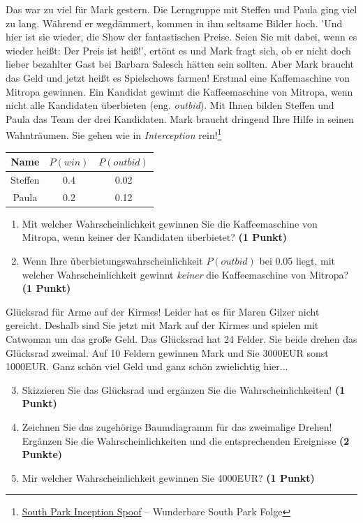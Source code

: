 \documentclass[a4paper, 9pt]{scrartcl}\usepackage[]{graphicx}\usepackage[]{xcolor}
\begin{document}
Das war zu viel für Mark gestern. Die Lerngruppe mit Steffen und Paula ging viel zu lang. Während er wegdämmert, kommen in ihm seltsame Bilder hoch. 'Und hier ist sie wieder, die Show der fantastischen Preise. Seien Sie mit dabei, wenn es wieder heißt: Der Preis ist heiß!', ertönt es und Mark fragt sich, ob er nicht doch lieber bezahlter Gast bei Barbara Salesch hätten sein sollten. Aber Mark braucht das Geld und jetzt heißt es Spielschows farmen! Erstmal eine Kaffemaschine von Mitropa gewinnen. Ein Kandidat gewinnt die Kaffeemaschine von Mitropa, wenn nicht alle Kandidaten überbieten (eng. \textit{outbid}). Mit Ihnen bilden Steffen und Paula das Team der drei Kandidaten. Mark braucht dringend Ihre Hilfe in seinen Wahnträumen. Sie gehen wie in \textit{Interception} rein!\footnote{\href{https://www.youtube.com/watch?v=3RhxyHMs-w8}{South Park Inception Spoof} -- Wunderbare South Park Folge}

\begin{center}
\begin{tabular}{ccc}
  \toprule
  Name & $P(win)$ & $P(outbid)$\\
  \midrule
  Steffen & 0.4 & 0.02\\
  Paula & 0.2 & 0.12 \\
  \bottomrule
\end{tabular}
\end{center}

\begin{enumerate}
\item Mit welcher Wahrscheinlichkeit gewinnen Sie die Kaffeemaschine von Mitropa, wenn keiner der Kandidaten überbietet? \textbf{(1 Punkt)}
\item Wenn Ihre überbietungswahrscheinlichkeit $P(outbid)$ bei 0.05 liegt, mit welcher Wahrscheinlichkeit gewinnt \textit{keiner} die Kaffeemaschine von Mitropa? \textbf{(1 Punkt)}
\end{enumerate}

Glücksrad für Arme auf der Kirmes! Leider hat es für Maren Gilzer nicht gereicht. Deshalb sind Sie jetzt mit Mark auf der Kirmes und spielen mit Catwoman um das große Geld. Das Glücksrad hat 24 Felder. Sie beide drehen das Glücksrad zweimal. Auf 10 Feldern gewinnen Mark und Sie 3000EUR sonst 1000EUR. Ganz schön viel Geld und ganz schön zwielichtig hier...

\begin{enumerate}
  \setcounter{enumi}{2}  
\item Skizzieren Sie das Glücksrad und ergänzen Sie die Wahrscheinlichkeiten! \textbf{(1 Punkt)}
\item Zeichnen Sie das zugehörige Baumdiagramm für das zweimalige Drehen! Ergänzen Sie die Wahrscheinlichkeiten und die entsprechenden Ereignisse \textbf{(2 Punkte)}
\item Mir welcher Wahrscheinlichkeit gewinnen Sie 4000EUR? \textbf{(1 Punkt)}
\end{enumerate}
\end{document}
